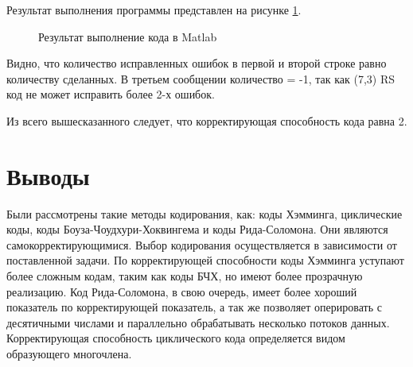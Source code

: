 \documentclass[a4paper,14pt]{extarticle}
\begin{document}
Результат выполнения программы представлен на рисунке \ref{12}.

\begin{figure}[H]
\caption{Результат выполнение кода в Matlab}
\label{12}
\end{figure}

Видно, что количество исправленных ошибок в первой и второй строке равно количеству сделанных. В третьем сообщении количество = -1, так как (7,3) RS код не может исправить более 2-х ошибок.

Из всего вышесказанного следует, что корректирующая способность кода равна 2.


\newpage

\section{Выводы}

Были рассмотрены такие методы кодирования, как: коды Хэмминга, циклические коды, коды Боуза-Чоудхури-Хоквингема и коды Рида-Соломона. Они являются самокорректирующимися. Выбор кодирования осуществляется в зависимости от поставленной задачи. По корректирующей способности коды Хэмминга уступают более сложным кодам, таким как коды БЧХ, но имеют более прозрачную реализацию. Код Рида-Соломона, в свою очередь, имеет более хороший показатель по корректирующей показатель, а так же позволяет оперировать с десятичными числами и параллельно обрабатывать несколько потоков данных. Корректирующая способность циклического кода определяется видом образующего многочлена.
\end{document}
